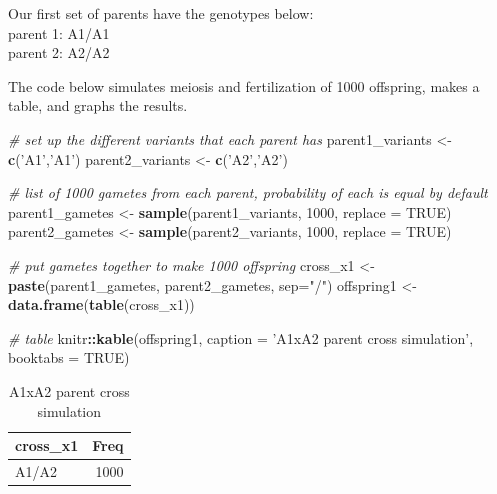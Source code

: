 \documentclass[]{book}
\newenvironment{Shaded}{\begin{snugshade}}{\end{snugshade}}
\newcommand{\KeywordTok}[1]{\textcolor[rgb]{0.13,0.29,0.53}{\textbf{#1}}}
\newcommand{\DataTypeTok}[1]{\textcolor[rgb]{0.13,0.29,0.53}{#1}}
\newcommand{\DecValTok}[1]{\textcolor[rgb]{0.00,0.00,0.81}{#1}}
\newcommand{\StringTok}[1]{\textcolor[rgb]{0.31,0.60,0.02}{#1}}
\newcommand{\CommentTok}[1]{\textcolor[rgb]{0.56,0.35,0.01}{\textit{#1}}}
\newcommand{\OtherTok}[1]{\textcolor[rgb]{0.56,0.35,0.01}{#1}}
\newcommand{\OperatorTok}[1]{\textcolor[rgb]{0.81,0.36,0.00}{\textbf{#1}}}
\newcommand{\NormalTok}[1]{#1}
\theoremstyle{definition}
\theoremstyle{definition}
\theoremstyle{definition}
\theoremstyle{remark}
\begin{document}
Our first set of parents have the genotypes below:\\
parent 1: A1/A1\\
parent 2: A2/A2

The code below simulates meiosis and fertilization of 1000 offspring,
makes a table, and graphs the results.

\begin{Shaded}
\begin{Highlighting}[]
\CommentTok{# set up the different variants that each parent has}
\NormalTok{parent1_variants <-}\StringTok{ }\KeywordTok{c}\NormalTok{(}\StringTok{'A1'}\NormalTok{,}\StringTok{'A1'}\NormalTok{)}
\NormalTok{parent2_variants <-}\StringTok{ }\KeywordTok{c}\NormalTok{(}\StringTok{'A2'}\NormalTok{,}\StringTok{'A2'}\NormalTok{)}

\CommentTok{# list of 1000 gametes from each parent, probability of each is equal by default}
\NormalTok{parent1_gametes <-}\StringTok{ }\KeywordTok{sample}\NormalTok{(parent1_variants, }\DecValTok{1000}\NormalTok{, }\DataTypeTok{replace =} \OtherTok{TRUE}\NormalTok{)}
\NormalTok{parent2_gametes <-}\StringTok{ }\KeywordTok{sample}\NormalTok{(parent2_variants, }\DecValTok{1000}\NormalTok{, }\DataTypeTok{replace =} \OtherTok{TRUE}\NormalTok{)}

\CommentTok{# put gametes together to make 1000 offspring}
\NormalTok{cross_x1 <-}\StringTok{ }\KeywordTok{paste}\NormalTok{(parent1_gametes, parent2_gametes, }\DataTypeTok{sep=}\StringTok{"/"}\NormalTok{)}
\NormalTok{offspring1 <-}\StringTok{ }\KeywordTok{data.frame}\NormalTok{(}\KeywordTok{table}\NormalTok{(cross_x1))}

\CommentTok{# table}
\NormalTok{knitr}\OperatorTok{::}\KeywordTok{kable}\NormalTok{(offspring1, }\DataTypeTok{caption =} \StringTok{'A1xA2 parent cross simulation'}\NormalTok{, }\DataTypeTok{booktabs =} \OtherTok{TRUE}\NormalTok{)}
\end{Highlighting}
\end{Shaded}

\begin{table}

\caption{\label{tab:unnamed-chunk-3}A1xA2 parent cross simulation}
\centering
\begin{tabular}[t]{lr}
\toprule
cross\_x1 & Freq\\
\midrule
A1/A2 & 1000\\
\bottomrule
\end{tabular}
\end{table}
\end{document}
